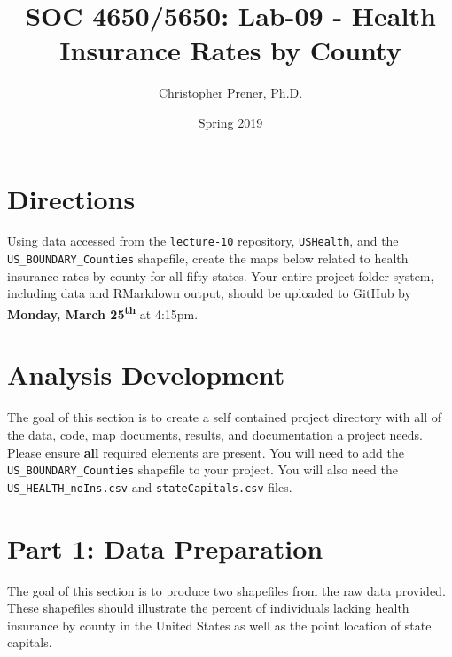 \documentclass{tufte-handout}
\title{SOC 4650/5650: Lab-09 - Health Insurance Rates by County}
\author{Christopher Prener, Ph.D.}
\date{Spring 2019}
\begin{document}

\maketitle %


\vspace{5mm}
\section{Directions}
Using data accessed from the \texttt{lecture-10} repository, \texttt{USHealth}, and the \texttt{US\_BOUNDARY\_Counties} shapefile, create the maps below related to health insurance rates by county for all fifty states. Your entire project folder system, including data and RMarkdown output, should be uploaded to GitHub by \textbf{Monday, March 25\textsuperscript{th}} at 4:15pm.

\vspace{5mm}
\section{Analysis Development}
The goal of this section is to create a self contained project directory with all of the data, code, map documents, results, and documentation a project needs. Please ensure \textbf{all} required elements are present. You will need to add the \texttt{US\_BOUNDARY\_Counties} shapefile to your project. You will also need the \texttt{US\_HEALTH\_noIns.csv} and \texttt{stateCapitals.csv} files.

\vspace{5mm}
\section{Part 1: Data Preparation}
The goal of this section is to produce two shapefiles from the raw data provided. These shapefiles should illustrate the percent of individuals lacking health insurance by county in the United States as well as the point location of state capitals. 
\end{document}
